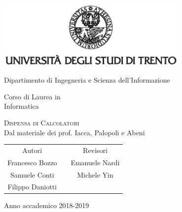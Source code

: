 \documentclass[class=book, crop=false, oneside]{standalone}
\begin{document}
\begin{titlepage}
	\centering
	\includegraphics[width=0.7\textwidth, keepaspectratio]{logo-unitn.eps}

	\vspace{1.6cm}
	\LARGE{Dipartimento di Ingegneria e Scienza dell'Informazione\\}

	\vspace{1cm}
	\Large{Corso di Laurea in\\ Informatica}

	\vspace{1cm}
	\Huge\textsc{Dispensa di Calcolatori\\}
	\large{Dal materiale dei prof. Iacca, Palopoli e Abeni}

	\vspace{2cm}
	\begin{tabularx}{\textwidth}{cXc}
		\Large{Autori} & & \Large{Revisori}\\
		\cmidrule(lr){1-1} \cmidrule(lr){3-3}
		\large{Francesco Bozzo} & & \large{Emanuele Nardi}\\
		\large{Samuele Conti} & & \large{Michele Yin}\\
		\large{Filippo Daniotti} & & \\
	\end{tabularx}

	\vspace{2cm}
	\LARGE{Anno accademico 2018-2019}
\end{titlepage}
\end{document}
